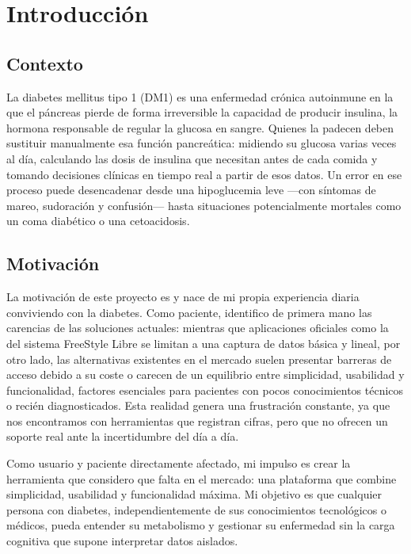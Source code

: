 
\chapter{Introducción}
\label{cap:introduccion}

\section{Contexto}
\label{sec:contexto}

La diabetes mellitus tipo 1 (DM1) es una enfermedad crónica autoinmune en la que el
páncreas pierde de forma irreversible la capacidad de producir insulina, la hormona
responsable de regular la glucosa en sangre. Quienes la padecen deben sustituir
manualmente esa función pancreática: midiendo su glucosa varias veces al día, calculando
las dosis de insulina que necesitan antes de cada comida y tomando decisiones clínicas en
tiempo real a partir de esos datos. Un error en ese proceso puede desencadenar desde
una hipoglucemia leve —con síntomas de mareo, sudoración y confusión— hasta situaciones
potencialmente mortales como un coma diabético o una cetoacidosis.

\section{Motivación}
\label{sec:motivación}
La motivación de este proyecto es  y nace de mi propia experiencia diaria conviviendo con la diabetes. Como paciente, identifico de primera mano las carencias de las soluciones actuales: mientras que aplicaciones oficiales como la del sistema FreeStyle Libre se limitan a una captura de datos básica y lineal, por otro lado, las alternativas existentes en el mercado suelen presentar barreras de acceso debido a su coste o carecen de un equilibrio entre simplicidad, usabilidad y funcionalidad, factores esenciales para pacientes con pocos conocimientos técnicos o recién diagnosticados. Esta realidad genera una frustración constante, ya que nos encontramos con herramientas que registran cifras, pero que no ofrecen un soporte real ante la incertidumbre del día a día.

Como usuario y paciente directamente afectado, mi impulso es crear la herramienta que considero que falta en el mercado: una plataforma que combine simplicidad, usabilidad y funcionalidad máxima. Mi objetivo es que cualquier persona con diabetes, independientemente de sus conocimientos tecnológicos o médicos, pueda entender su metabolismo y gestionar su enfermedad sin la carga cognitiva que supone interpretar datos aislados.

